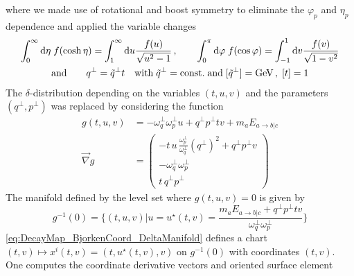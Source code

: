 where we made use of rotational and boost symmetry to eliminate the $\varphi_p$ and $\eta_p$ dependence and applied the variable changes
\begin{gather*}
    \int_0^\infty\text{d}\eta\;f(\cosh\eta)=\int_1^\infty\text{d} u\frac{f(u)}{\sqrt{u^2-1}}\,,\qquad \int_0^\pi\text{d}\varphi\;f(\cos\varphi)=\int_{-1}^1\text{d} v\frac{f(v)}{\sqrt{1-v^2}}\\
   \text{and}\qquad q^\perp=\tilde{q}^\perp t\quad\text{with}\;\tilde{q}^\perp={\text{const.}}\;\text{and}\;[\tilde{q}^\perp]=\text{GeV}\,,\;[t]=1
\end{gather*}
The $\delta$-distribution depending on the variables $(t,u,v)$ and the parameters $(q^\perp,p^\perp)$ was replaced by considering the function
\begin{subequations}
    \begin{align}
        g(t,u,v)&=-\omega_q^\perp \omega_p^\perp u+q^\perp p^\perp tv+m_a E_{a\rightarrow b\vert c}\\
        \vec{\nabla} g&=
        \begin{pmatrix}
            -t\,u\,\frac{\omega_p^\perp}{\omega_q^\perp}(q^\perp)^2+q^\perp p^\perp v\\
            -\omega_q^\perp\omega_p^\perp\\
            t\,q^\perp p^\perp
        \end{pmatrix}
    \end{align}
\end{subequations}
The manifold defined by the level set where $g(t,u,v)=0$ is given by 
\begin{equation}
    g^{-1}(0)=\Bigg\{(t,u,v)\Big\vert u=u^\star(t,v)=\frac{m_aE_{a\rightarrow b\vert c}+q^\perp p^\perp tv}{\omega_q^\perp\omega_p^\perp}\Bigg\}
    \label{eq:DecayMap_BjorkenCoord_DeltaManifold}
\end{equation}
\eqref{eq:DecayMap_BjorkenCoord_DeltaManifold} defines a chart $(t,v)\mapsto x^i(t,v)=(t,u^\star(t,v),v)$ on $g^{-1}(0)$ with coordinates $(t,v)$. One computes the coordinate derivative vectors and oriented surface element
